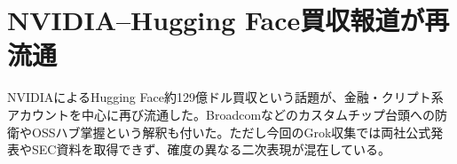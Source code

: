 \section{NVIDIA--Hugging Face買収報道が再流通}
NVIDIAによるHugging Face約129億ドル買収という話題が、金融・クリプト系アカウントを中心に再び流通した。Broadcomなどのカスタムチップ台頭への防衛やOSSハブ掌握という解釈も付いた。ただし今回のGrok収集では両社公式発表やSEC資料を取得できず、確度の異なる二次表現が混在している。
